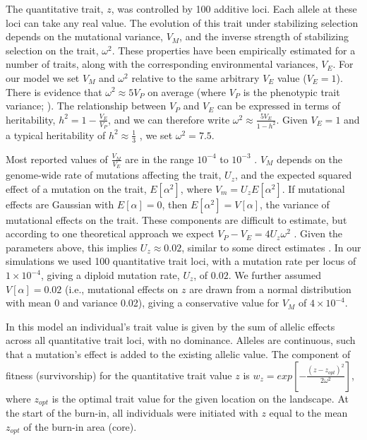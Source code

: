 The quantitative trait, $z$, was controlled by 100 additive loci. Each allele at these loci can take any real value. The evolution of this trait under stabilizing selection depends on the mutational variance, $V_M$, and the inverse strength of stabilizing selection on the trait, $\omega^2$. These properties have been empirically estimated for a number of traits, along with the corresponding environmental variances, $V_E$. For our model we set $V_M$ and $\omega^2$ relative to the same arbitrary $V_E$ value ($V_E = 1$). There is evidence that $\omega^2 \approx 5 V_P$ on average (where $V_P$ is the phenotypic trait variance; \citet{Kingsolver:2001, Johnson:2005}). The relationship between $V_P$ and $V_E$ can be expressed in terms of heritability, $h^2 = 1 - \frac{V_E}{V_P}$, and we can therefore write $\omega^2 \approx \frac{5V_E}{1 - h^2}$. Given $V_E = 1$ and a typical heritability of $h^2 \approx \frac{1}{3}$ \citep{Mousseau:1987, Houle:1992}, we set $\omega^2 = 7.5$.  

Most reported values of $\frac{V_M}{V_E}$ are in the range $10^{-4}$ to $10^{-3}$ \citep{Houle:1996}. $V_M$ depends on the genome-wide rate of mutations affecting the trait, $U_z$, and the expected squared effect of a mutation on the trait, $E[\alpha^2]$, where $V_m = U_z E[\alpha^2]$. If mutational effects are Gaussian with $E[\alpha] = 0$, then $E[\alpha^2] = V[\alpha]$, the variance of mutational effects on the trait. These components are difficult to estimate, but according to one theoretical approach we expect $V_P - V_E = 4 U_z \omega^2$ \citep{Turelli:1984, Charlesworth:2010}. Given the parameters above, this implies $U_z \approx 0.02$, similar to some direct estimates \citep{Lynch:1998}. In our simulations we used 100 quantitative trait loci, with a mutation rate per locus of $1\times10^{-4}$, giving a diploid mutation rate, $U_z$, of $0.02$. We further assumed $V[\alpha] = 0.02$ (i.e., mutational effects on $z$ are drawn from a normal distribution with mean 0 and variance 0.02), giving a conservative value for $V_M$ of $4\times10^{-4}$.

In this model an individual's trait value is given by the sum of allelic effects across all quantitative trait loci, with no dominance. Alleles are continuous, such that a mutation's effect is added to the existing allelic value. The component of fitness (survivorship) for the quantitative trait value $z$ is $w_z = exp[-\frac{(z-z_{opt})^2}{2\omega^2}]$, where $z_{opt}$ is the optimal trait value for the given location on the landscape. At the start of the burn-in, all individuals were initiated with $z$ equal to the mean $z_{opt}$ of the burn-in area (core). 

